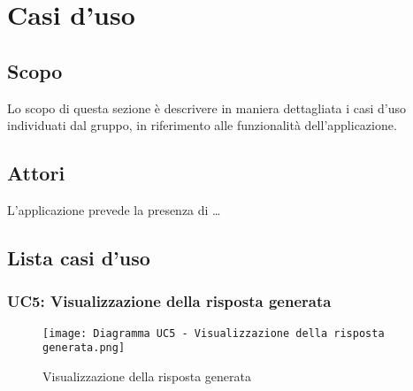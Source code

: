 
\setcounter{secnumdepth}{5} %


\section{Casi d'uso}
\label{sec:casi_uso}

\subsection{Scopo}

Lo scopo di questa sezione è descrivere in maniera dettagliata i casi d’uso individuati dal
gruppo, in riferimento alle funzionalità dell’applicazione.


\subsection{Attori}

L’applicazione prevede la presenza di \dots


\subsection{Lista casi d'uso}



\hypertarget{UC5}{}
\subsubsection{UC5: Visualizzazione della risposta generata}

\begin{figure}[h]
    \centering
    \texttt{[image: Diagramma UC5 - Visualizzazione della risposta generata.png]}
    \caption{Visualizzazione della risposta generata}
\end{figure}

